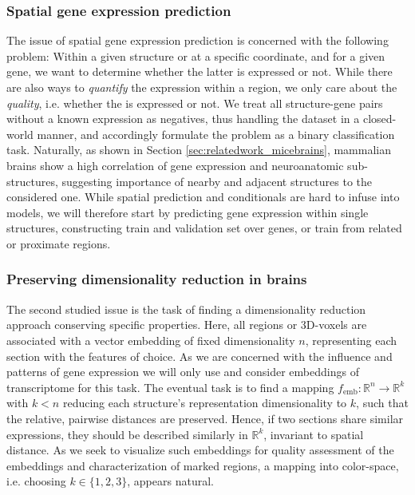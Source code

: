 \documentclass[]{article}
\begin{document}
\subsubsection{Spatial gene expression prediction}
\label{sec:probdesc_geneexp}
The issue of spatial gene expression prediction is concerned with the following problem: Within a given structure or at a specific coordinate, and for a given gene, we want to determine whether the latter is expressed or not. While there are also ways to \textit{quantify} the expression within a region, we only care about the \textit{quality}, i.e. whether the is expressed or not. We treat all structure-gene pairs without a known expression as negatives, thus handling the dataset in a closed-world manner, and accordingly formulate the problem as a binary classification task. Naturally, as shown in Section \ref{sec:relatedwork_micebrains}, mammalian brains show a high correlation of gene expression and neuroanatomic sub-structures, suggesting importance of nearby and adjacent structures to the considered one. While spatial prediction and conditionals are hard to infuse into models, we will therefore start by predicting gene expression within single structures, constructing train and validation set over genes, or train from related or proximate regions.

\subsubsection{Preserving dimensionality reduction in brains}
\label{sec:probdesc_dimpres}
The second studied issue is the task of finding a dimensionality reduction approach conserving specific properties. Here, all regions or 3D-voxels are associated with a vector embedding of fixed dimensionality $n$, representing each section with the features of choice. As we are concerned with the influence and patterns of gene expression we will only use and consider embeddings of transcriptome for this task. The eventual task is to find a mapping $f_{\text{emb}}:\mathbb{R}^n \rightarrow \mathbb{R}^k$ with $k<n$ reducing each structure's representation dimensionality to $k$, such that the relative, pairwise distances are preserved. Hence, if two sections share similar expressions, they should be described similarly in $\mathbb{R}^k$, invariant to spatial distance. As we seek to visualize such embeddings for quality assessment of the embeddings and characterization of marked regions, a mapping into color-space, i.e. choosing $k\in\{1,2,3\}$, appears natural.
\end{document}
